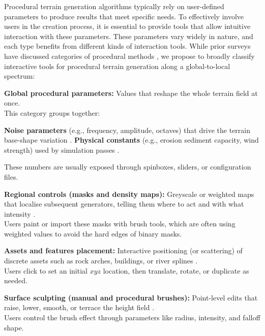 Procedural terrain generation algorithms typically rely on user-defined parameters to produce results that meet specific needs. To effectively involve users in the creation process, it is essential to provide tools that allow intuitive interaction with these parameters. These parameters vary widely in nature, and each type benefits from different kinds of interaction tools. While prior surveys have discussed categories of procedural methods \cite{Smelik2009,Smelik2014,Galin2019}, we propose to broadly classify interactive tools for procedural terrain generation along a global-to-local spectrum: 
\begin{Itemize}
    \Item{} \textbf{Global procedural parameters:} Values that reshape the whole terrain field at once. \\
    This category groups together:
        \begin{Itemize}
            \Item{} \textbf{Noise parameters} (e.g., frequency, amplitude, octaves) that drive the terrain base-shape variation \cite{Perlin1985,Fournier1982}.
            \Item{} \textbf{Physical constants} (e.g., erosion sediment capacity, wind strength) used by simulation passes \cite{Benes2001a,Paris2019b}.
        \end{Itemize}
        These numbers are usually exposed through spinboxes, sliders, or configuration files.

    \Item{} \textbf{Regional controls (masks and density maps):} Greyscale or weighted maps that localise subsequent generators, telling them where to act and with what intensity \cite{DeCarpentier2009,Stachniak2005}. \\
    Users paint or import these masks with brush tools, which are often using weighted values to avoid the hard edges of binary masks.

    \Item{} \textbf{Assets and features placement:} Interactive positioning (or scattering) of discrete assets such as rock arches, buildings, or river splines \cite{Becher2017,Grosbellet2016}. \\  
    Users click to set an initial $xyz$ location, then translate, rotate, or duplicate as needed.

    \Item{} \textbf{Surface sculpting (manual and procedural brushes):} Point-level edits that raise, lower, smooth, or terrace the height field \cite{Galyean1991,Gain2005,Chen2021}. \\
    Users control the brush effect through parameters like radius, intensity, and falloff shape.
\end{Itemize}

